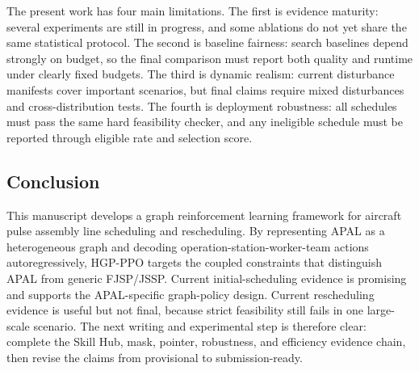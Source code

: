 The present work has four main limitations. The first is evidence maturity: several experiments are still in progress, and some ablations do not yet share the same statistical protocol. The second is baseline fairness: search baselines depend strongly on budget, so the final comparison must report both quality and runtime under clearly fixed budgets. The third is dynamic realism: current disturbance manifests cover important scenarios, but final claims require mixed disturbances and cross-distribution tests. The fourth is deployment robustness: all schedules must pass the same hard feasibility checker, and any ineligible schedule must be reported through eligible rate and selection score.

\subsection{Conclusion}

This manuscript develops a graph reinforcement learning framework for aircraft pulse assembly line scheduling and rescheduling. By representing APAL as a heterogeneous graph and decoding operation-station-worker-team actions autoregressively, HGP-PPO targets the coupled constraints that distinguish APAL from generic FJSP/JSSP. Current initial-scheduling evidence is promising and supports the APAL-specific graph-policy design. Current rescheduling evidence is useful but not final, because strict feasibility still fails in one large-scale scenario. The next writing and experimental step is therefore clear: complete the Skill Hub, mask, pointer, robustness, and efficiency evidence chain, then revise the claims from provisional to submission-ready.
